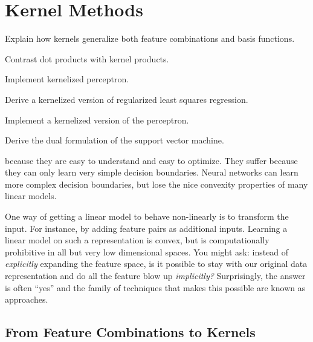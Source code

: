 \chapter{Kernel Methods} \label{sec:kernel}

\chapterquote{}{}

\begin{learningobjectives}
\item Explain how kernels generalize both feature combinations and
  basis functions.
\item Contrast dot products with kernel products.
\item Implement kernelized perceptron.
\item Derive a kernelized version of regularized least squares
  regression.
\item Implement a kernelized version of the perceptron.
\item Derive the dual formulation of the support vector machine.
\end{learningobjectives}

\dependencies{}

 because they are easy to
understand and easy to optimize.  They suffer because they can only
learn very simple decision boundaries.  Neural networks can learn more
complex decision boundaries, but lose the nice convexity properties of
many linear models.

One way of getting a linear model to behave non-linearly is to
transform the input.  For instance, by adding feature pairs as
additional inputs.  Learning a linear model on such a representation
is convex, but is computationally prohibitive in all but very low
dimensional spaces.  You might ask: instead of \emph{explicitly}
expanding the feature space, is it possible to stay with our original
data representation and do all the feature blow up \emph{implicitly?}
Surprisingly, the answer is often ``yes'' and the family of techniques
that makes this possible are known as  approaches.

\begin{comment}
   - From feature combinations and basis functions to kernels
   - Dot products versus kernels
   - Kernel/dual perceptron
   - Support vector machines
\end{comment}

\section{From Feature Combinations to Kernels}

